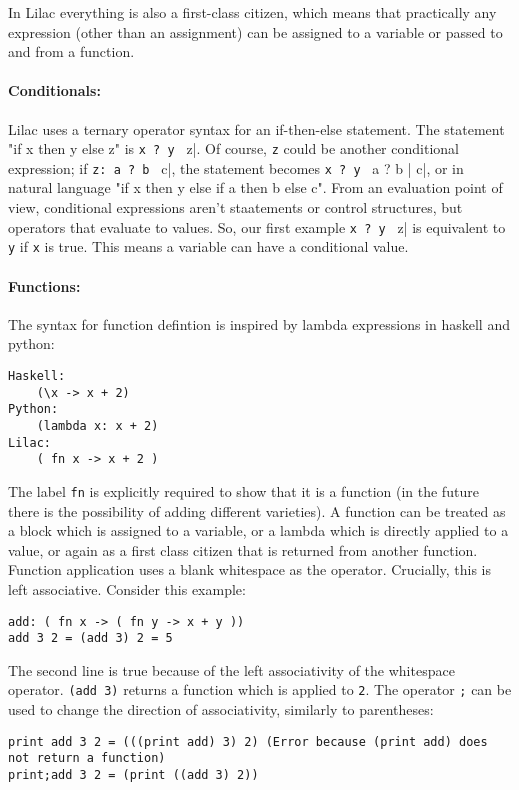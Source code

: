 \documentclass[a4paper, 12pt]{article}
\begin{document}
In Lilac everything is also a first-class citizen, which means that practically any expression (other than an assignment) can be assigned to a variable or passed to and from a function.

\paragraph{Conditionals:}
Lilac uses a ternary operator syntax for an if-then-else statement. The statement "if x then y else z" is \verb|x ? y | z|. Of course, \verb|z| could be another conditional expression; if \verb|z: a ? b | c|, the statement becomes \verb|x ? y | a ? b | c|, or in natural language "if x then y else if a then b else c". From an evaluation point of view, conditional expressions aren't staatements or control structures, but operators that evaluate to values. So, our first example \verb|x ? y | z| is equivalent to \verb|y| if \verb|x| is true. This means a variable can have a conditional value.

\paragraph{Functions:}
The syntax for function defintion is inspired by lambda expressions in haskell and python:\\
\begin{verbatim}
Haskell:
	(\x -> x + 2)
Python:
	(lambda x: x + 2)
Lilac:
	( fn x -> x + 2 )
\end{verbatim}

The label \verb|fn| is explicitly required to show that it is a function (in the future there is the possibility of adding different varieties). A function can be treated as a block which is assigned to a variable, or a lambda which is directly applied to a value, or again as a first class citizen that is returned from another function. Function application uses a blank whitespace as the operator. Crucially, this is left associative. Consider this example:
\begin{verbatim}
add: ( fn x -> ( fn y -> x + y ))
add 3 2 = (add 3) 2 = 5
\end{verbatim}

The second line is true because of the left associativity of the whitespace operator. \verb|(add 3)| returns a function which is applied to \verb|2|. The operator \verb|;| can be used to change the direction of associativity, similarly to parentheses:\\
\begin{verbatim}
print add 3 2 = (((print add) 3) 2) (Error because (print add) does not return a function)
print;add 3 2 = (print ((add 3) 2))
\end{verbatim}
\end{document}
